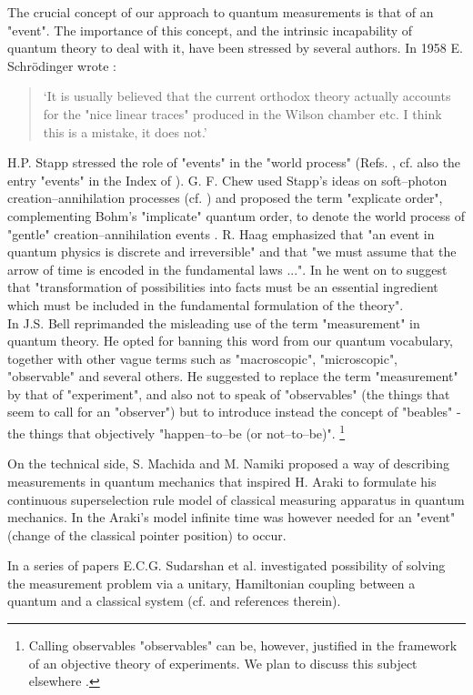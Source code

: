 \documentclass[12pt]{article}
\begin{document}
The crucial concept of our approach to quantum measurements is that of an
"event". The importance of this concept, and the intrinsic incapability of
quantum theory to deal with it, have been stressed by several authors. In
1958 E. Schr\"odinger wrote \cite{sch1}:
\begin{quotation} \lq It is usually believed that the current orthodox
theory actually accounts for the "nice linear traces" produced in the
Wilson chamber etc. I think this is a mistake, it does not.\rq
\end{quotation}
H.P. Stapp stressed the role of "events" in the "world process" (Refs.
\cite{stap2,stap3}, cf. also the entry "events" in the Index of
\cite{stap4}). G. F. Chew used Stapp's ideas on soft--photon
creation--annihilation processes (cf. \cite{stap5}) and proposed the term
"explicate order", complementing Bohm's "implicate" quantum order, to
denote the world process of "gentle" creation--annihilation events
\cite{chew1}. R. Haag emphasized \cite{haag1} that "an event in quantum
physics is discrete and irreversible" and that "we must assume that the
arrow of time is encoded in the fundamental laws ...". In \cite{haag2} he
went on to suggest that "transformation of possibilities into facts must be
an essential ingredient which must be included in the fundamental
formulation of the theory".\\
In \cite{bel1,bel2} J.S. Bell reprimanded the misleading use of the term
"measurement" in quantum theory. He opted for banning this word from our
quantum vocabulary, together with other vague terms such as "macroscopic",
"microscopic", "observable" and several others. He suggested to replace the
term "measurement" by that of "experiment", and also not to speak of
"observables" (the things that seem to call for an "observer") but to
introduce instead the concept of "beables" - the things that objectively
"happen--to--be (or not--to--be)". \footnote{Calling observables
"observables" can be, however, justified in the framework of an objective
theory of experiments. We plan to discuss this subject elsewhere .}

On the technical side, S. Machida and M. Namiki \cite{mach1} proposed a way
of describing measurements in quantum mechanics that inspired H. Araki
\cite{ara1,ara2} to formulate his continuous superselection rule model of
classical measuring apparatus in quantum mechanics. In the Araki's model
infinite time was however needed for an "event" (change of the classical
pointer position) to occur.

In a series of papers E.C.G. Sudarshan et al.  investigated possibility
 of solving the measurement problem via a unitary, Hamiltonian
coupling between a quantum and a classical system (cf. \cite{su1} and
references therein).
\end{document}
